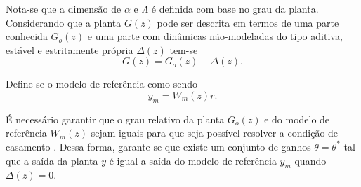     Nota-se que a dimensão de $\alpha$ e $\Lambda$ é definida com base no grau da planta. Considerando que a planta $G(z)$ pode ser descrita em termos de uma parte conhecida $G_o(z)$ e uma parte com dinâmicas não-modeladas do tipo aditiva, estável e estritamente própria $\Delta(z)$ tem-se
    \begin{equation}
        G(z) = G_o(z) + \Delta(z) \text{.}
        \label{eq:planta_go_delta}
    \end{equation}

    Define-se o modelo de referência como sendo
    \begin{equation*}
        y_m = W_m(z) r \text{.}
    \end{equation*}

    É necessário garantir que o grau relativo da planta $G_o(z)$ e do modelo de referência $W_m(z)$ sejam iguais para que seja possível resolver a condição de casamento \cite{ref:IOANNOU}. Dessa forma, garante-se que existe um conjunto de ganhos $\theta = \theta^*$ tal que a saída da planta $y$ é igual a saída do modelo de referência $y_m$ quando $\Delta(z) = 0$.

